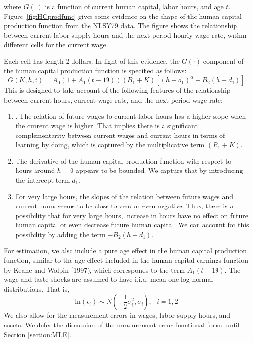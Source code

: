 \documentclass{article}
\begin{document}
  where $G(\cdot)$ is a function of current human capital, labor hours, and age $t$. Figure~\ref{fig:HCprodfunc} gives some evidence on the shape of the human capital production function from the NLSY79 data. The figure shows the relationship between current labor supply hours and the next period hourly wage rate, within different cells for the current wage.

  Each cell has length 2 dollars. In light of this evidence, the $G(\cdot)$ component of the human capital production function is specified as follows:
  \begin{equation} \tag{4b}
    G(K,h,t) = A_0(1 + A_1(t-19))(B_1+K)[(h+d_1)^{\alpha} - B_2(h+d_1)]
  \end{equation}
  This is designed to take account of the following features of the relationship between current hours, current wage rate, and the next period wage rate:
  \begin{enumerate}
  \item . The relation of future wages to current labor hours has a higher slope when the current wage is higher. That implies there is a significant complementarity between current wages and current hours in terms of learning by doing, which is captured by the multiplicative term $(B_1 + K)$.
  \item The derivative of the human capital production function with respect to hours around $h = 0$ appears to be bounded. We capture that by introducing the intercept term $d_1$.
  \item For very large hours, the slopes of the relation between future wages and current hours seems to be close to zero or even negative. Thus, there is a possibility that for very large hours, increase in hours have no effect on future human capital or even decrease future human capital. We can account for this possibility by adding the term $-B_2(h+d_1)$.
  \end{enumerate}
For estimation, we also include a pure age effect in the human capital production function, similar to the age effect included in the human capital earnings function by Keane and Wolpin (1997), which corresponds to the term $A_1(t - 19)$. The wage and taste shocks are assumed to have i.i.d. mean one log normal distributions. That is,
  \begin{equation} \tag{7}
    \text{ln} (\epsilon_i) \sim N(-\frac{1}{2} \sigma_i^2, \sigma_i),~~~i=1,2
  \end{equation}
We also allow for the measurement errors in wages, labor supply hours, and assets. We defer the discussion of the measurement error functional forms until Section \ref{section:MLE}. \par
\end{document}
